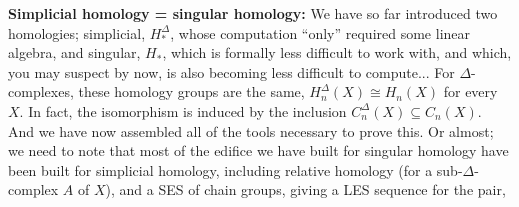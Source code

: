 \def\ccy{\Cyan}		  %
\def\cpb{\ProcessBlue}	  %
\def\csb{\SkyBlue}	  %
\def\ctu{\Turquoise}	  %
\def\ctb{\TealBlue}	  %
\def\caq{\Aquamarine}	  %
\def\cbg{\BlueGreen}	  %
\def\cem{\Emerald}	  %
\def\csg{\SeaGreen}	  %
\def\cgg{\Green}	  %
\def\cfg{\ForestGreen}	  %
\def\cpg{\PineGreen}	  %
\def\clg{\LimeGreen}	  %
\def\cyg{\YellowGreen}	  %
\def\cspg{\SpringGreen}	  %
\def\cog{\OliveGreen}	  %
\def\pars{\RawSienna}	  %
\def\cse{\Sepia}		  %
\def\cbr{\Brown}		  %
\def\cta{\Tan}		  %
\def\cgr{\Gray}		  %
\def\cbl{\Black}		  %
\def\cwh{\White}		  %


\loadmsbm



\def\ctln{\centerline}
\def\u{\underbar}
\def\ssk{\smallskip}
\def\msk{\medskip}
\def\bsk{\bigskip}
\def\hsk{\hskip.1in}
\def\hhsk{\hskip.2in}
\def\dsl{\displaystyle}
\def\hskp{\hskip1.5in}

\def\lra{$\Leftrightarrow$ }
\def\ra{\rightarrow}
\def\mpto{\logmapsto}
\def\pu{\pi_1}
\def\mpu{$\pi_1$}
\def\sig{\Sigma}
\def\msig{$\Sigma$}
\def\ep{\epsilon}
\def\sset{\subseteq}
\def\del{\partial}
\def\inv{^{-1}}
\def\wtl{\widetilde}
\def\del{\partial}
\def\delp{\partial^\prime}
\def\delpp{\partial^{\prime\prime}}
\def\sgn{{\roman{sgn}}}
\def\wtih{\widetilde{H}}
\def\bbz{{\Bbb Z}}
\def\bbr{{\Bbb R}}





{\bf Simplicial homology = singular homology:}
We have so far introduced two homologies; simplicial, $H_*^\Delta$, whose computation 
``only'' required some linear algebra,
and singular, $H_*$, which is formally less difficult to work with, and which, you may suspect by now, is also becoming
less difficult to compute... For $\Delta$-complexes, these homology groups are the same, $H_n^\Delta(X)\cong H_n(X)$
for every $X$. In fact, the isomorphism is induced by the inclusion $C_n^\Delta(X)\sset C_n(X)$. And we have
now assembled all of the tools necessary to prove this. Or almost; we need to note that most of the edifice we
have built for singular homology \u{could} have been built for simplicial homology, including relative 
homology (for a sub-$\Delta$-complex $A$ of $X$), and a SES of chain groups, giving a LES sequence for the pair,

